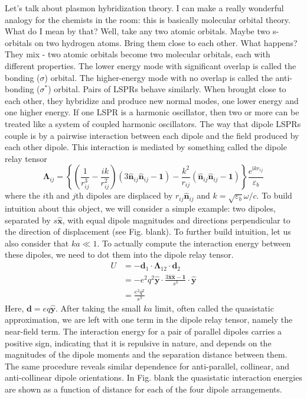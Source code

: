 \documentclass [11pt, proquest] {uwthesis}[2016/11/22]
\begin{document}
Let's talk about plasmon hybridization theory. I can make a really wonderful analogy for the chemists in the room: this is basically molecular orbital theory. What do I mean by that? Well, take any two atomic orbitals. Maybe two s-orbitals on two hydrogen atoms. Bring them close to each other. What happens? They mix - two atomic orbitals become two molecular orbitals, each with different properties. The lower energy mode with significant overlap is called the bonding ($\sigma$) orbital. The higher-energy mode with no overlap is called the anti-bonding ($\sigma^*$) orbital. Pairs of LSPRs behave similarly. When brought close to each other, they hybridize and produce new normal modes, one lower energy and one higher energy. If one LSPR is a harmonic oscillator, then two or more can be treated like a system of coupled harmonic oscillators. The way that dipole LSPRs couple is by a pairwise interaction between each dipole and the field produced by each other dipole. This interaction is mediated by something called the dipole relay tensor 
\begin{equation}
\boldsymbol{\Lambda}_{ij} = \left\{\left(\frac{1}{r_{ij}^3} - \frac{ik}{r_{ij}^2}\right)\left(3\hat{\textbf{n}}_{ij}\hat{\textbf{n}}_{ij} - \textbf{1}\right) - \frac{k^2}{r_{ij}}\left(\hat{\textbf{n}}_{ij}\hat{\textbf{n}}_{ij} - \textbf{1}\right)\right\}\frac{e^{\textrm{i}kr_{ij}}}{\varepsilon_b}
\label{dipole_relay_tensor_full}
\end{equation}
where the $i$th and $j$th dipoles are displaced by $r_{ij}\hat{\textbf{n}}_{ij}$ and $k=\sqrt{\varepsilon_b}\omega/c$. To build intuition about this object, we will consider a simple example: two dipoles, separated by $s\hat{\textbf{x}}$, with equal dipole magnitudes and directions perpendicular to the direction of displacement (see Fig. blank). To further build intuition, let us also consider that $ka \ll 1$. To actually compute the interaction energy between these dipoles, we need to dot them into the dipole relay tensor.
\begin{equation}
\begin{split}
U &= -\textbf{d}_1\cdot\boldsymbol{\Lambda}_{12}\cdot\textbf{d}_2\\
&= -e^2q^2\hat{\textbf{y}}\cdot\frac{3\hat{\textbf{x}}\hat{\textbf{x}} - \textbf{1}}{s^3}\cdot\hat{\textbf{y}}\\
&= \frac{e^2q^2}{s^3}
\label{quasi_int}
\end{split}
\end{equation}
Here, $\textbf{d}=eq\hat{\textbf{y}}$. After taking the small $ka$ limit, often called the quasistatic approximation, we are left with one term in the dipole relay tensor, namely the near-field term. The interaction energy for a pair of parallel dipoles carries a positive sign, indicating that it is repulsive in nature, and depends on the magnitudes of the dipole moments and the separation distance between them. The same procedure reveals similar dependence for anti-parallel, collinear, and anti-collinear dipole orientations. In Fig. blank the quasistatic interaction energies are shown as a function of distance for each of the four dipole arrangements.
\end{document}

